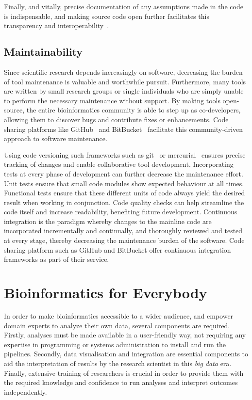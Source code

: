 \begin{justify}
Finally, and vitally, precise documentation of any assumptions made in the code is indispensable, and making source code open further facilitates this transparency and interoperability~\cite{ince2012case}.


\subsection{Maintainability}
Since scientific research depends increasingly on software, decreasing the burden of tool maintenance is valuable and worthwhile pursuit. Furthermore, many tools are written by small research groups or single individuals who are simply unable to perform the necessary maintenance without support. By making tools open-source, the entire bioinformatics community is able to step up as co-developers, allowing them to discover bugs and contribute fixes or enhancements. Code sharing platforms like GitHub~\cite{url-github} and BitBucket~\cite{url-bitbucket} facilitate this community-driven approach to software maintenance.

Using code versioning such frameworks such as git~\cite{url-git} or mercurial~\cite{url-mercurial} ensures precise tracking of changes and enable collaborative tool development. Incorporating tests at every phase of development can further decrease the maintenance effort. Unit tests ensure that small code modules show expected behaviour at all times. Functional tests ensure that these different units of code always yield the desired result when working in conjunction. Code quality checks can help streamline the code itself and increase readability, benefiting future development. Continuous integration is the paradigm whereby changes to the mainline code are incorporated incrementally and continually, and thoroughly reviewed and tested at every stage, thereby decreasing the maintenance burden of the software. Code sharing platform such as GitHub and BitBucket offer continuous integration frameworks as part of their service.



\section{Bioinformatics for Everybody}

In order to make bioinformatics accessible to a wider audience, and empower domain experts to analyze their own data, several components are required. Firstly, analyses must be made available in a user-friendly way, not requiring any expertise in programming or systems administration to install and run the pipelines. Secondly, data visualisation and integration are essential components to aid the interpretation of results by the research scientist in this \emph{big data} era. Finally, extensive training of researchers is crucial in order to provide them with the required knowledge and confidence to run analyses and interpret outcomes independently.


\end{justify}
